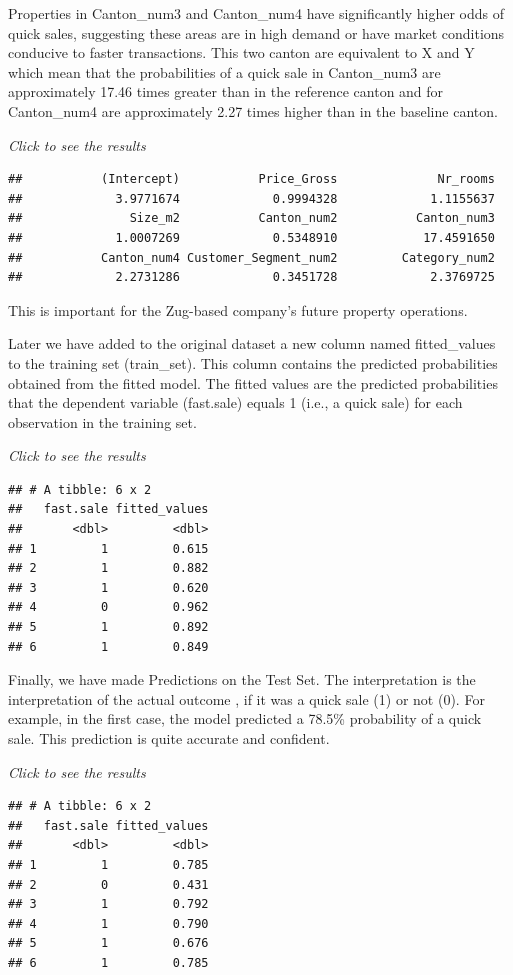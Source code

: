 \documentclass[
]{article}
\begin{document}
Properties in Canton\_num3 and Canton\_num4 have significantly higher
odds of quick sales, suggesting these areas are in high demand or have
market conditions conducive to faster transactions. This two canton are
equivalent to X and Y which mean that the probabilities of a quick sale
in Canton\_num3 are approximately 17.46 times greater than in the
reference canton and for Canton\_num4 are approximately 2.27 times
higher than in the baseline canton.

\emph{Click to see the results}

\begin{verbatim}
##           (Intercept)           Price_Gross              Nr_rooms 
##             3.9771674             0.9994328             1.1155637 
##               Size_m2           Canton_num2           Canton_num3 
##             1.0007269             0.5348910            17.4591650 
##           Canton_num4 Customer_Segment_num2         Category_num2 
##             2.2731286             0.3451728             2.3769725
\end{verbatim}

This is important for the Zug-based company's future property
operations.

Later we have added to the original dataset a new column named
fitted\_values to the training set (train\_set). This column contains
the predicted probabilities obtained from the fitted model. The fitted
values are the predicted probabilities that the dependent variable
(fast.sale) equals 1 (i.e., a quick sale) for each observation in the
training set.

\emph{Click to see the results}

\begin{verbatim}
## # A tibble: 6 x 2
##   fast.sale fitted_values
##       <dbl>         <dbl>
## 1         1         0.615
## 2         1         0.882
## 3         1         0.620
## 4         0         0.962
## 5         1         0.892
## 6         1         0.849
\end{verbatim}

Finally, we have made Predictions on the Test Set. The interpretation is
the interpretation of the actual outcome , if it was a quick sale (1) or
not (0). For example, in the first case, the model predicted a 78.5\%
probability of a quick sale. This prediction is quite accurate and
confident.

\emph{Click to see the results}

\begin{verbatim}
## # A tibble: 6 x 2
##   fast.sale fitted_values
##       <dbl>         <dbl>
## 1         1         0.785
## 2         0         0.431
## 3         1         0.792
## 4         1         0.790
## 5         1         0.676
## 6         1         0.785
\end{verbatim}
\end{document}
